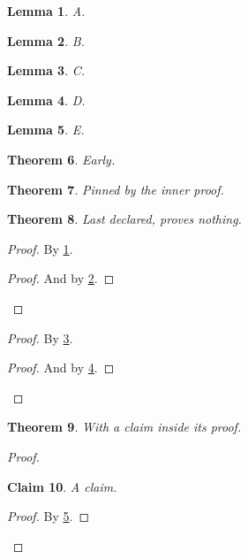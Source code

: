 \documentclass{article}
\newtheorem{theorem}{Theorem}
\newtheorem{lemma}[theorem]{Lemma}
\newtheorem{claim}[theorem]{Claim}
\begin{document}
\begin{lemma}\label{lem:a}A.\end{lemma}
\begin{lemma}\label{lem:b}B.\end{lemma}
\begin{lemma}\label{lem:c}C.\end{lemma}
\begin{lemma}\label{lem:d}D.\end{lemma}
\begin{lemma}\label{lem:e}E.\end{lemma}
\begin{theorem}\label{thm:early}Early.\end{theorem}
\begin{theorem}\label{thm:pinned}Pinned by the inner proof.\end{theorem}
\begin{theorem}\label{thm:last}Last declared, proves nothing.\end{theorem}

\begin{proof}
  By \ref{lem:a}.
  \begin{proof}
    And by \ref{lem:b}.
  \end{proof}
\end{proof}

\begin{proof}
  By \ref{lem:c}.
  \begin{proof}
    And by \ref{lem:d}.
  \end{proof}
\end{proof}

\begin{theorem}\label{thm:claimed}With a claim inside its proof.\end{theorem}
\begin{proof}
  \begin{claim}\label{clm:one}A claim.\end{claim}
  \begin{proof}
    By \ref{lem:e}.
  \end{proof}
\end{proof}
\end{document}
